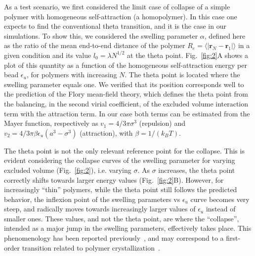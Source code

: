 \documentclass[
preprint,
a4paper,
12pt,
superscriptaddress,
pre]{revtex4}
\begin{document}
As a test scenario, we first considered the limit case of collapse of
a simple polymer with homogeneous self-attraction (a homopolymer). In
this case one expects to find the conventional theta transition, and it
is the case in our simulations. To show this, we considered the
swelling parameter $\alpha$, defined here as the ratio of the mean
end-to-end distance of the polymer $R_e=\langle |\mathbf{r}_N -
\mathbf{r}_1| \rangle$ in a given condition and its value $l_0=
\lambda N^{1/2}$
at the theta point.  Fig.~\ref{fig:2}A shows a plot of this quantity
as a function of the homogeneous self-attraction energy per bead
$\epsilon_u$, for polymers with increasing $N$. The theta point is
located where the swelling parameter equals one.  We verified that its
position corresponds well to the prediction of the Flory mean-field
theory, which defines the theta point from the balancing, in the
second virial coefficient, of the excluded volume interaction term
with the attraction term. In our case both terms can be estimated from
the Mayer function, respectively as $v_1 = 4/3 \pi \sigma^3$
(repulsion) and $v_2= 4/3 \pi \beta \epsilon_u (a^3 - \sigma^3)$
(attraction), with $\beta=1/(k_B T) $.


The theta point is not the only relevant reference point for the
collapse. This is evident considering the collapse curves of the
swelling parameter for varying excluded volume (Fig.~\ref{fig:2}),
i.e. varying $\sigma$.  As $\sigma$ increases, the theta point
correctly shifts towards larger energy values (Fig.~\ref{fig:2}B).
However, for increasingly ``thin'' polymers, while the theta point
still follows the predicted behavior, the inflexion point of the
swelling parameters vs $\epsilon_u$ curve becomes very steep, and
radically moves towards increasingly larger values of $\epsilon_u$
instead of smaller ones. These values, and not the theta point, are
where the ``collapse'', intended as a major jump in the swelling
parameters, effectively takes place.
This phenomenology has been reported previously~\cite{DeGennes1975},
and may correspond to a first-order transition related to polymer
crystallization~\cite{Taylor2009}.
\end{document}
